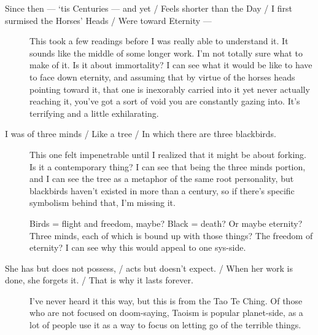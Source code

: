 \begin{description}
\item[Since then — `tis Centuries — and yet / Feels shorter than the Day / I first surmised the Horses' Heads / Were toward Eternity —]
This took a few readings before I was really able to understand it. It sounds like the middle of some longer work. I'm not totally sure what to make of it. Is it about immortality? I can see what it would be like to have to face down eternity, and assuming that by virtue of the horses heads pointing toward it, that one is inexorably carried into it yet never actually reaching it, you've got a sort of void you are constantly gazing into. It's terrifying and a little exhilarating.
\item[I was of three minds / Like a tree / In which there are three blackbirds.]
This one felt impenetrable until I realized that it might be about forking. Is it a contemporary thing? I can see that being the three minds portion, and I can see the tree as a metaphor of the same root personality, but blackbirds haven't existed in more than a century, so if there's specific symbolism behind that, I'm missing it.

Birds = flight and freedom, maybe? Black = death? Or maybe eternity? Three minds, each of which is bound up with those things? The freedom of eternity? I can see why this would appeal to one sys-side.
\item[She has but does not possess, / acts but doesn't expect. / When her work is done, she forgets it. / That is why it lasts forever.]
I've never heard it this way, but this is from the Tao Te Ching. Of those who are not focused on doom-saying, Taoism is popular planet-side, as a lot of people use it as a way to focus on letting go of the terrible things.


\end{description}
